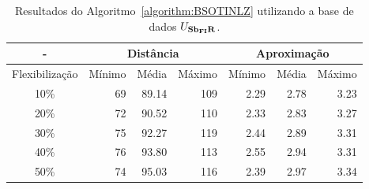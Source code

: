 \begin{table}[!htb]
  \caption{Resultados do Algoritmo~\ref{algorithm:BSOTINLZ} utilizando a base de dados $U_{\textbf{Sb\textsubscript{FI}R}}{}$.}
  \label{table:APQPJYRX}
  \centering
  \begin{tabular}{|c|r|r|r|r|r|r|}
    \hline
      -            & \multicolumn{3}{c|}{Distância}             & \multicolumn{3}{c|}{Aproximação}           \\ \hline
    Flexibilização & Mínimo       & Média        & Máximo       & Mínimo       & Média        & Máximo       \\ \hline  
    10\%           & 69           & 89.14        & 109          & 2.29         & 2.78         & 3.23         \\ \hline
    20\%           & 72           & 90.52        & 110          & 2.33         & 2.83         & 3.27         \\ \hline
    30\%           & 75           & 92.27        & 119          & 2.44         & 2.89         & 3.31         \\ \hline
    40\%           & 76           & 93.80        & 113          & 2.55         & 2.94         & 3.31         \\ \hline
    50\%           & 74           & 95.03        & 116          & 2.39         & 2.97         & 3.34         \\ \hline    
  \end{tabular}
\end{table}
